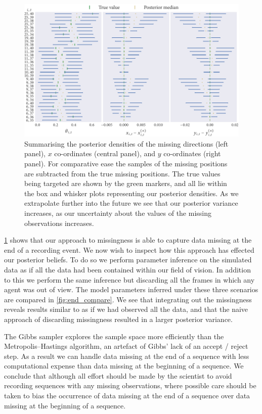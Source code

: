 \begin{figure}[tbp]
  \includegraphics{end/summary.pdf}
  \caption{Summarising the posterior densities of the missing directions (left
  panel), $x$ co-ordinates (central panel), and $y$ co-ordinates (right
  panel). For comparative ease the samples of the missing positions are
  subtracted from the true missing positions. The true values being
  targeted are shown by the green markers, and all lie within the box and
  whisker plots representing our posterior densities. As we extrapolate further
  into the future we see that our posterior variance increases, as our
  uncertainty about the values of the missing observations increases.}
  \label{fig:end_summary}
\end{figure}

\cref{fig:end_summary} shows that our approach to missingness is able to
capture data missing at the end of a recording event. We now wish to inspect
how this approach has effected our posterior beliefs. To do so we perform
parameter inference on the simulated data as if all the data had been contained
within our field of vision. In addition to this we perform the same inference
but discarding all the frames in which any agent was out of view. The model
parameters inferred under these three scenarios are compared in
\cref{fig:end_compare}. We see that integrating out the missingness reveals
results similar to as if we had observed all the data, and that the naive
approach of discarding missingness resulted in a larger posterior variance.

The Gibbs sampler explores the sample space more efficiently than the
Metropolis--Hastings algorithm, an artefact of Gibbs' lack of an accept / reject
step. As a result we can handle data missing at the end of a sequence with
less computational expense than data missing at the beginning of a sequence.
We conclude that although all effort should be made by the scientist to avoid
recording sequences with any missing observations, where possible care should
be taken to bias the occurrence of data missing at the end of a sequence over
data missing at the beginning of a sequence.

